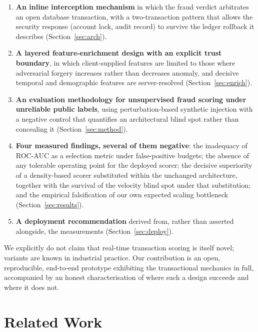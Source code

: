 \documentclass[journal]{IEEEtran}
\begin{document}
\begin{enumerate}
\item \textbf{An inline interception mechanism} in which the fraud verdict
arbitrates an open database transaction, with a two-transaction pattern that
allows the security response (account lock, audit record) to survive the
ledger rollback it describes (Section~\ref{sec:arch}).

\item \textbf{A layered feature-enrichment design with an explicit trust
boundary}, in which client-supplied features are limited to those where
adversarial forgery increases rather than decreases anomaly, and decisive
temporal and demographic features are server-resolved
(Section~\ref{sec:enrich}).

\item \textbf{An evaluation methodology for unsupervised fraud scoring under
unreliable public labels}, using perturbation-based synthetic injection with
a negative control that quantifies an architectural blind spot rather than
concealing it (Section~\ref{sec:method}).

\item \textbf{Four measured findings, several of them negative}: the
inadequacy of ROC-AUC as a selection metric under false-positive budgets;
the absence of any tolerable operating point for the deployed scorer; the
decisive superiority of a density-based scorer substituted within the
unchanged architecture, together with the survival of the velocity blind
spot under that substitution; and the empirical falsification of our own
expected scaling bottleneck (Section~\ref{sec:results}).

\item \textbf{A deployment recommendation} derived from, rather than
asserted alongside, the measurements (Section~\ref{sec:deploy}).
\end{enumerate}

We explicitly do not claim that real-time transaction scoring is itself
novel; variants are known in industrial practice. Our contribution is an
open, reproducible, end-to-end prototype exhibiting the transactional
mechanics in full, accompanied by an honest characterisation of where such a
design succeeds and where it does not.

\section{Related Work}
\end{document}
